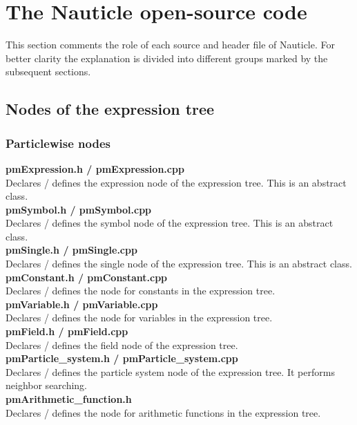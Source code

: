 \documentclass[a4paper,12pt,openany]{book}
\theoremstyle{break}
\begin{document}
\section{The Nauticle open-source code}
This section comments the role of each source and header file of Nauticle. For better clarity the explanation is divided into different groups marked by the subsequent sections.
\subsection{Nodes of the expression tree}
\subsubsection{Particlewise nodes}
\textbf{pmExpression.h / pmExpression.cpp} \\
Declares / defines the expression node of the expression tree. This is an abstract class. \\

\textbf{pmSymbol.h / pmSymbol.cpp} \\
Declares / defines the symbol node of the expression tree. This is an abstract class. \\

\textbf{pmSingle.h / pmSingle.cpp} \\
Declares / defines the single node of the expression tree. This is an abstract class. \\

\textbf{pmConstant.h / pmConstant.cpp} \\
Declares / defines the node for constants in the expression tree. \\

\textbf{pmVariable.h / pmVariable.cpp} \\
Declares / defines the node for variables in the expression tree. \\

\textbf{pmField.h / pmField.cpp} \\
Declares / defines the field node of the expression tree. \\

\textbf{pmParticle\_system.h / pmParticle\_system.cpp} \\
Declares / defines the particle system node of the expression tree. It performs neighbor searching. \\

\textbf{pmArithmetic\_function.h} \\
Declares / defines the node for arithmetic functions in the expression tree. \\
\end{document}
